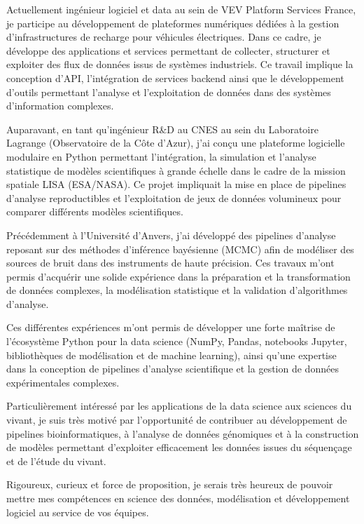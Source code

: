 \documentclass[10pt,a4paper]{altacv}
\begin{document}
Actuellement ingénieur logiciel et data au sein de VEV Platform Services France, je participe au développement de plateformes numériques dédiées à la gestion d’infrastructures de recharge pour véhicules électriques. Dans ce cadre, je développe des applications et services permettant de collecter, structurer et exploiter des flux de données issus de systèmes industriels. Ce travail implique la conception d’API, l’intégration de services backend ainsi que le développement d’outils permettant l’analyse et l’exploitation de données dans des systèmes d’information complexes.

Auparavant, en tant qu’ingénieur R\&D au CNES au sein du Laboratoire Lagrange (Observatoire de la Côte d’Azur), j’ai conçu une plateforme logicielle modulaire en Python permettant l’intégration, la simulation et l’analyse statistique de modèles scientifiques à grande échelle dans le cadre de la mission spatiale LISA (ESA/NASA). Ce projet impliquait la mise en place de pipelines d’analyse reproductibles et l’exploitation de jeux de données volumineux pour comparer différents modèles scientifiques.

Précédemment à l’Université d’Anvers, j’ai développé des pipelines d’analyse reposant sur des méthodes d’inférence bayésienne (MCMC) afin de modéliser des sources de bruit dans des instruments de haute précision. Ces travaux m’ont permis d’acquérir une solide expérience dans la préparation et la transformation de données complexes, la modélisation statistique et la validation d’algorithmes d’analyse.

Ces différentes expériences m’ont permis de développer une forte maîtrise de l’écosystème Python pour la data science (NumPy, Pandas, notebooks Jupyter, bibliothèques de modélisation et de machine learning), ainsi qu’une expertise dans la conception de pipelines d’analyse scientifique et la gestion de données expérimentales complexes.

Particulièrement intéressé par les applications de la data science aux sciences du vivant, je suis très motivé par l’opportunité de contribuer au développement de pipelines bioinformatiques, à l’analyse de données génomiques et à la construction de modèles permettant d’exploiter efficacement les données issues du séquençage et de l’étude du vivant.

Rigoureux, curieux et force de proposition, je serais très heureux de pouvoir mettre mes compétences en science des données, modélisation et développement logiciel au service de vos équipes.
\end{document}
